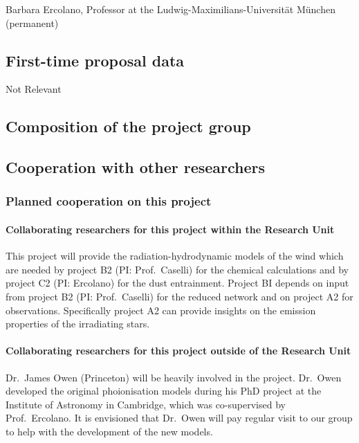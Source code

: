 \documentclass[10pt,fleqn,twoside]{article}
\begin{document}
Barbara Ercolano, Professor at the Ludwig-Maximilians-Universit\"at
M\"unchen  (permanent)

\subsection{First-time proposal data}

Not Relevant

\subsection{Composition of the project group}



\subsection{Cooperation with other researchers}

\subsubsection{Planned cooperation on this project}

\paragraph{Collaborating researchers for this project within the
  Research Unit}


This project will provide the radiation-hydrodynamic models of the
wind which are needed by project B2 (PI: Prof.\ Caselli) for the
chemical calculations and by project C2 (PI: Ercolano) for the dust
entrainment. Project BI depends on input from project B2 (PI:
Prof.\ Caselli)  for the reduced network and on
project A2 for observations. Specifically project A2 can
provide insights on the emission properties of the irradiating stars.

\paragraph{Collaborating researchers for this project outside of
  the Research Unit}
Dr.\ James Owen (Princeton) will be heavily involved in the
project. Dr.\ Owen developed the original
phoionisation models during his PhD project at the Institute of
Astronomy in Cambridge, which was co-supervised by
Prof.\ Ercolano. It is envisioned that Dr.\ Owen will pay regular visit
to our group to help with the development of the new models. 
\end{document}
